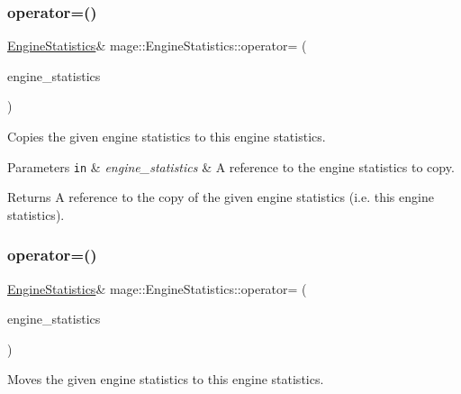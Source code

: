\subsubsection{\texorpdfstring{operator=()}{operator=()}\hspace{0.1cm}{\footnotesize\ttfamily [1/2]}}
{\footnotesize\ttfamily \hyperlink{structmage_1_1_engine_statistics}{Engine\+Statistics}\& mage\+::\+Engine\+Statistics\+::operator= (\begin{DoxyParamCaption}\item[{const \hyperlink{structmage_1_1_engine_statistics}{Engine\+Statistics} \&}]{engine\+\_\+statistics }\end{DoxyParamCaption})\hspace{0.3cm}{\ttfamily [default]}}

Copies the given engine statistics to this engine statistics.


\begin{DoxyParams}[1]{Parameters}
\mbox{\tt in}  & {\em engine\+\_\+statistics} & A reference to the engine statistics to copy. \\
\hline
\end{DoxyParams}
\begin{DoxyReturn}{Returns}
A reference to the copy of the given engine statistics (i.\+e. this engine statistics). 
\end{DoxyReturn}
\hypertarget{structmage_1_1_engine_statistics_a4674d3856fee372e05f1bed017e46d5b}{}\label{structmage_1_1_engine_statistics_a4674d3856fee372e05f1bed017e46d5b} 
\subsubsection{\texorpdfstring{operator=()}{operator=()}\hspace{0.1cm}{\footnotesize\ttfamily [2/2]}}
{\footnotesize\ttfamily \hyperlink{structmage_1_1_engine_statistics}{Engine\+Statistics}\& mage\+::\+Engine\+Statistics\+::operator= (\begin{DoxyParamCaption}\item[{\hyperlink{structmage_1_1_engine_statistics}{Engine\+Statistics} \&\&}]{engine\+\_\+statistics }\end{DoxyParamCaption})\hspace{0.3cm}{\ttfamily [default]}}

Moves the given engine statistics to this engine statistics.


